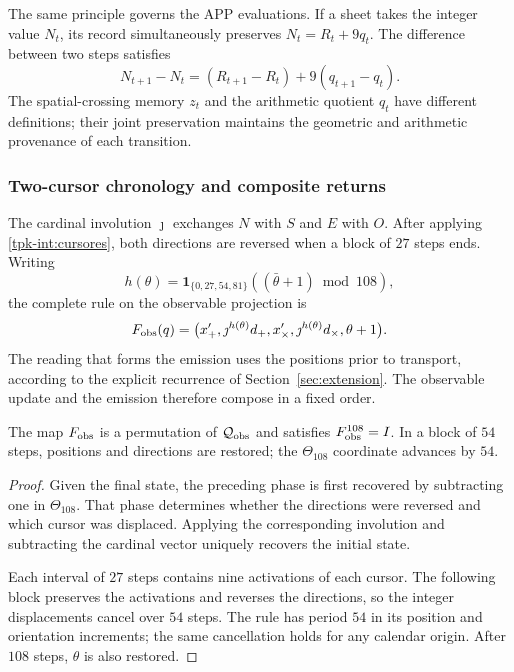 The same principle governs the APP evaluations. If a sheet takes the
integer value \(N_t\), its record simultaneously preserves
\(N_t=R_t+9q_t\). The difference between two steps satisfies
\[
 N_{t+1}-N_t=(R_{t+1}-R_t)+9(q_{t+1}-q_t).
\]
The spatial-crossing memory \(z_t\) and the arithmetic quotient \(q_t\)
have different definitions; their joint preservation maintains the
geometric and arithmetic provenance of each transition.

\subsubsection{Two-cursor chronology and composite returns}
\label{tpk-int:cronologia}

The cardinal involution \(\jmath\) exchanges \(N\) with \(S\) and
\(E\) with \(O\). After applying \eqref{tpk-int:cursores}, both
directions are reversed when a block of \(27\) steps ends.
Writing
\[
 h(\theta)=\mathbf1_{\{0,27,54,81\}}
             ((\bar\theta+1)\bmod108),
\]
the complete rule on the observable projection is
\begin{equation}
 F_{\rm obs}(q)=
 \bigl(x_+',\jmath^{h(\theta)}d_+,
       x_\times',\jmath^{h(\theta)}d_\times,
       \theta+1\bigr).
 \label{tpk-int:fobs}
\end{equation}
The reading that forms the emission uses the positions prior to
transport, according to the explicit recurrence of
Section~\ref{sec:extension}. The observable update and the emission
therefore compose in a fixed order.

\begin{proposition}
\label{tpk-int:periodo}
The map \(F_{\rm obs}\) is a permutation of
\(\mathcal Q_{\rm obs}\) and satisfies \(F_{\rm obs}^{108}=I\).
In a block of \(54\) steps, positions and directions are restored;
the \(\Theta_{108}\) coordinate advances by \(54\).
\end{proposition}
\begin{proof}
Given the final state, the preceding phase is first recovered by subtracting one
in \(\Theta_{108}\). That phase determines whether the directions were
reversed and which cursor was displaced. Applying the corresponding involution
and subtracting the cardinal vector uniquely recovers the initial state.

Each interval of \(27\) steps contains nine activations of each
cursor. The following block preserves the activations and reverses the
directions, so the integer displacements cancel over
\(54\) steps. The rule has period \(54\) in its position and
orientation increments; the same cancellation holds for any calendar
origin. After \(108\) steps, \(\theta\) is also restored.
\end{proof}

